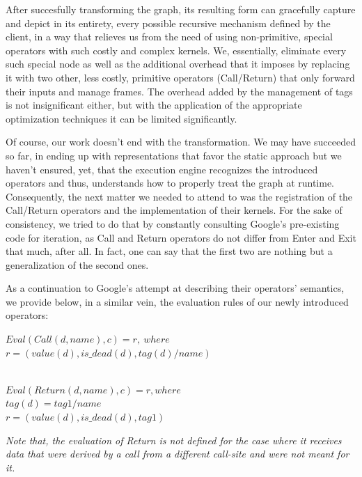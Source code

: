 \documentclass[ack,preface]{dithesis}
\begin{document}
After succesfully transforming the graph, its resulting form can gracefully capture and depict in its entirety, every possible recursive mechanism defined by the client, in a way that relieves us from the need of using non-primitive, special operators with such costly and complex kernels. We, essentially,  eliminate every such special node as well as the additional overhead that it imposes by replacing it with two other, less costly, primitive operators (Call/Return) that only forward their inputs and manage frames.  The overhead added by the management of tags is not insignificant either, but with the application of the appropriate optimization techniques it can be limited significantly.

Of course, our work doesn't end with the transformation. We may have succeeded so far, in ending up with representations that favor the static approach but we haven't ensured, yet, that the  execution engine recognizes the introduced operators and thus, understands how to properly treat the graph at runtime. Consequently, the next matter we needed to attend to was the registration of the Call/Return operators and the implementation of their kernels.  For the sake of consistency, we tried to do that by constantly consulting Google's pre-existing code for iteration, as Call and Return operators do not differ from Enter and Exit that much, after all. In fact, one can say that the first two are nothing but a generalization of the second ones. 



\begin{flushleft}
\setlength{\parindent}{20ex}As a continuation to Google's attempt at describing their operators' semantics, we provide below, in a similar vein, 
the evaluation rules of our newly introduced operators:

 $Eval(Call(d, name), c) = r,\  where$ \\
\setlength{\parindent}{25ex} $r = (value(d), is\_dead(d), tag(d)/name)$ 


\setlength{\parindent}{20ex} \ \\
$Eval(Return(d, name), c) = r, where \ $ \\
\setlength{\parindent}{25ex} $tag(d) = tag1/name$\\
$ r = (value(d), is\_dead(d), tag1)$
\end{flushleft}

\textit{Note that, the evaluation of Return is not defined for the case where it receives data that were derived by a call from a different call-site and were not meant for it.}\\
\end{document}
